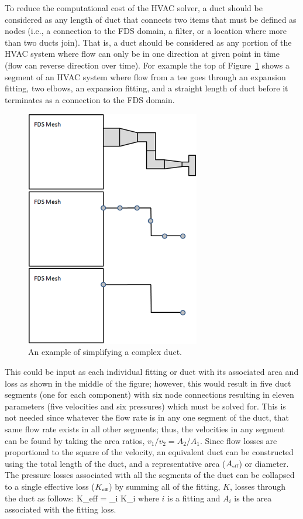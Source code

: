 \documentclass[11pt]{book}
\begin{document}
To reduce the computational cost of the HVAC solver, a duct should be considered as any length of duct that connects two items that must be defined as nodes (i.e., a connection to the FDS domain, a filter, or a location where more than two ducts join).  That is, a duct should be considered as any portion of the HVAC system where flow can only be in one direction at given point in time (flow can reverse direction over time).  For example the top of Figure~\ref{fig:HVAC_Simplify} shows a segment of an HVAC system where flow from a tee goes through an expansion fitting, two elbows, an expansion fitting, and a straight length of duct before it terminates as a connection to the FDS domain.
\begin{figure}[ht]
\begin{center}
\includegraphics[width=3in]{FIGURES/hvac-simplify}
\end{center}
\caption[An example of simplifying a complex duct]{An example of simplifying a complex duct.}
\label{fig:HVAC_Simplify}
\end{figure}
This could be input as each individual fitting or duct with its associated area and loss as shown in the middle of the figure; however, this would result in five duct segments (one for each component) with six node connections resulting in eleven parameters (five velocities and six pressures) which must be solved for.  This is not needed since whatever the flow rate is in any one segment of the duct, that same flow rate exists in all other segments; thus, the velocities in any segment can be found by taking the area ratios, $v_1/v_2=A_2/A_1$.  Since flow losses are proportional to the square of the velocity, an equivalent duct can be constructed using the total length of the duct, and a representative area ($A_{\mbox{\tiny eff}}$) or diameter.  The pressure losses associated with all the segments of the duct can be collapsed to a single effective loss ($K_{\mbox{\tiny eff}}$) by summing all of the fitting, $K$, losses through the duct as follows:
\be K_{\mbox{\tiny eff}} = \sum_i {K_i } \ee
where $i$ is a fitting and $A_i$ is the area associated with the fitting loss.
\end{document}
